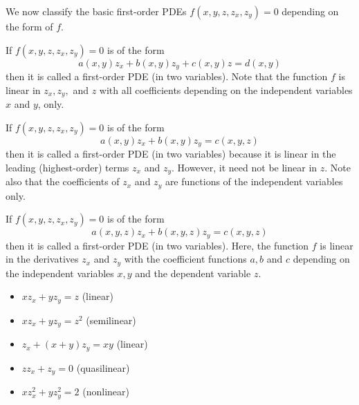 We now classify the basic first-order PDEs $f(x,y,z,z_x,z_y) = 0$ depending on the form of $f$.

\begin{definition}
    If $f(x,y,z,z_x,z_y) = 0$ is of the form \begin{equation*}
        a(x,y)z_x + b(x,y)z_y + c(x,y)z = d(x,y)
    \end{equation*}
    then it is called a  first-order PDE (in two variables). Note that the function $f$ is linear in $z_x,z_y,$ and $z$ with all coefficients depending on the independent variables $x$ and $y$, only.
\end{definition}


\begin{definition}
    If $f(x,y,z,z_x,z_y) = 0$ is of the form \begin{equation*}
        a(x,y)z_x + b(x,y)z_y = c(x,y,z)
    \end{equation*}
    then it is called a  first-order PDE (in two variables) because it is linear in the leading (highest-order) terms $z_x$ and $z_y$. However, it need not be linear in $z$. Note also that the coefficients of $z_x$ and $z_y$ are functions of the independent variables only.
\end{definition}


\begin{definition}
    If $f(x,y,z,z_x,z_y) = 0$ is of the form \begin{equation*}
        a(x,y,z)z_x + b(x,y,z)z_y = c(x,y,z)
    \end{equation*}
    then it is called a  first-order PDE (in two variables). Here, the function $f$ is linear in the derivatives $z_x$ and $z_y$ with the coefficient functions $a,b$ and $c$ depending on the independent variables $x,y$ and the dependent variable $z$.
\end{definition}


\begin{example}
    \leavevmode
    \begin{itemize}
        \item $xz_x+yz_y= z$ (linear)
        \item $xz_x + yz_y = z^2$ (semilinear)
        \item $z_x+(x+y)z_y = xy$ (linear)
        \item $zz_x+z_y = 0$ (quasilinear)
        \item $xz_x^2+yz_y^2=2$ (nonlinear)
    \end{itemize}
\end{example}

